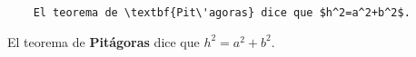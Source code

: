 \documentclass{article}
\begin{document}
\begin{center}

\begin{verbatim}
    El teorema de \textbf{Pit\'agoras} dice que $h^2=a^2+b^2$. 
\end{verbatim}

El teorema de \textbf{Pit\'agoras} dice que $h^2=a^2+b^2$. 
\end{center}
\end{document}
